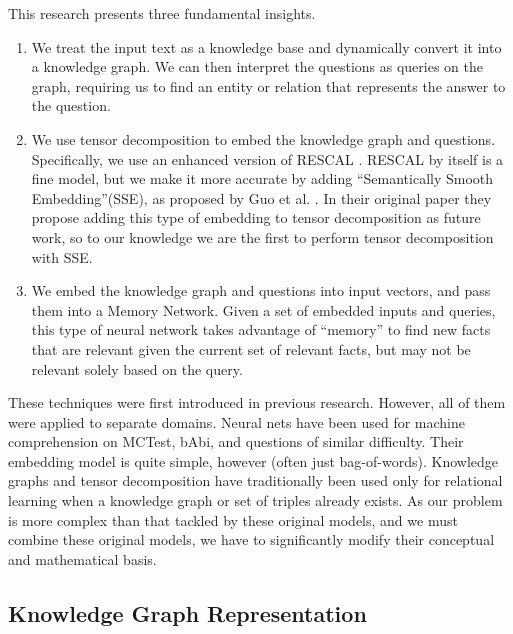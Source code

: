 \documentclass[pageno]{final_paper}
\begin{document}
This research presents three fundamental insights. \\

\begin{enumerate}

    \item We treat the input text as a knowledge base and dynamically convert it
    into a knowledge graph. We can then interpret the questions as queries on
    the graph, requiring us to find an entity or relation that represents the
    answer to the question. \\

    \item We use tensor decomposition to embed the knowledge graph and
    questions. Specifically, we use an enhanced version of RESCAL
    \cite{Nickel2011}. RESCAL by itself is a fine model, but we make it more
    accurate by adding ``Semantically Smooth Embedding''(SSE), as proposed by
    Guo et al. \cite{Guo2015}. In their original paper they propose adding this
    type of embedding to tensor decomposition as future work, so to our
    knowledge we are the first to perform tensor decomposition with SSE. \\

    \item We embed the knowledge graph and questions into input vectors, and
    pass them into a Memory Network. Given a set of embedded inputs and queries,
    this type of neural network takes advantage of ``memory'' to find new facts
    that are relevant given the current set of relevant facts, but may not be
    relevant solely based on the query. \\

\end{enumerate}

These techniques were first introduced in previous research. However, all of
them were applied to separate domains. Neural nets have been used for machine
comprehension on MCTest, bAbi, and questions of similar difficulty. Their
embedding model is quite simple, however (often just bag-of-words). Knowledge
graphs and tensor decomposition have traditionally been used only for relational
learning when a knowledge graph or set of triples already exists. As our problem
is more complex than that tackled by these original models, and we must combine
these original models, we have to significantly modify their conceptual and
mathematical basis.

\subsection{Knowledge Graph Representation}
\label{Knowledge Graph Representation}
\end{document}
